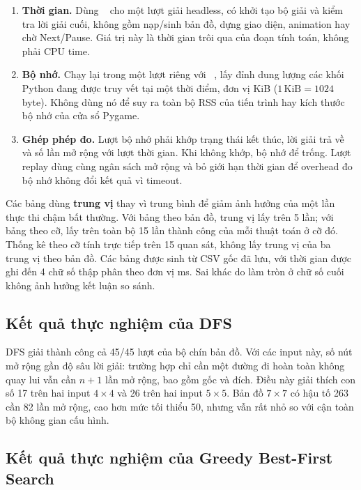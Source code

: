 \begin{enumerate}
\item \textbf{Thời gian.} Dùng ~\cite{pytime} cho một
      lượt giải headless, có khởi tạo bộ giải và kiểm tra lời giải cuối, không
      gồm nạp/sinh bản đồ, dựng giao diện, animation hay chờ Next/Pause.
      Giá trị này là thời gian trôi qua của đoạn tính toán, không phải CPU time.
\item \textbf{Bộ nhớ.} Chạy lại trong một lượt riêng với
      ~\cite{pytrace}, lấy đỉnh dung lượng các khối Python
      đang được truy vết tại một thời điểm, đơn vị KiB
      ($1\,\mathrm{KiB}=1024$ byte). Không dùng nó để suy ra
      toàn bộ RSS của tiến trình hay kích thước bộ nhớ của cửa sổ Pygame.
\item \textbf{Ghép phép đo.} Lượt bộ nhớ phải khớp trạng thái kết thúc, lời
      giải trả về và số lần mở rộng với lượt thời gian. Khi không khớp, bộ
      nhớ để trống. Lượt replay dùng cùng ngân sách mở rộng và bỏ giới hạn
      thời gian để overhead đo bộ nhớ không đổi kết quả vì timeout.
\end{enumerate}

Các bảng dùng \textbf{trung vị} thay vì trung bình để giảm ảnh hưởng của một
lần thực thi chậm bất thường. Với bảng theo bản đồ, trung vị lấy trên 5 lần;
với bảng theo cỡ, lấy trên toàn bộ 15 lần thành công của mỗi thuật toán ở cỡ
đó. Thống kê theo cỡ tính trực tiếp trên 15 quan sát, không lấy trung vị của
ba trung vị theo bản đồ. Các bảng được sinh từ CSV gốc đã lưu, với thời gian
được ghi đến 4 chữ số thập phân theo đơn vị ms. Sai khác do làm tròn ở chữ số
cuối không ảnh hưởng kết luận so sánh.

\subsection{Kết quả thực nghiệm của DFS}


DFS giải thành công cả 45/45 lượt của bộ chín bản đồ. Với các input này,
số nút mở rộng gần độ sâu lời giải: trường hợp chỉ cần một đường đi hoàn
toàn không quay lui vẫn cần $n+1$ lần mở rộng, bao gồm gốc và đích. Điều này
giải thích con số 17 trên hai input $4\times4$ và 26 trên hai input $5\times5$.
Bản đồ $7\times7$ có hậu tố 263 cần 82 lần mở rộng, cao hơn mức tối thiểu 50,
nhưng vẫn rất nhỏ so với cận toàn bộ không gian cấu hình.

\subsection{Kết quả thực nghiệm của Greedy Best-First Search}


